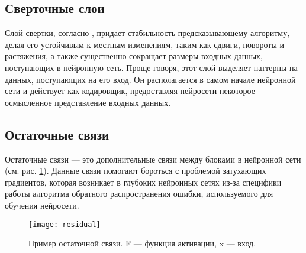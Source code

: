 \subsection{Сверточные слои}

Слой свертки, согласно \cite{goodfellow}, придает стабильность предсказывающему
алгоритму, делая его устойчивым к местным изменениям, таким как сдвиги,
повороты и растяжения, а также существенно сокращает размеры входных данных,
поступающих в нейронную сеть. Проще говоря, этот слой выделяет паттерны на
данных, поступающих на его вход. Он располагается в самом начале нейронной сети
и действует как кодировщик, предоставляя нейросети некоторое осмысленное
представление входных данных.

\subsection{Остаточные связи}
Остаточные связи \cite{residual} --- это дополнительные связи между блоками
в нейронной сети (см. рис. \ref{fig:residual}). Данные связи помогают бороться с проблемой
затухающих градиентов, которая возникает в глубоких нейронных сетях из-за
специфики работы алгоритма обратного распространения ошибки, используемого для
обучения нейросети.

\begin{figure}[!htb]
	\centering
	\texttt{[image: residual]}
	\caption{Пример остаточной связи. F --- функция активации, x --- вход.}
	\label{fig:residual}
\end{figure}
